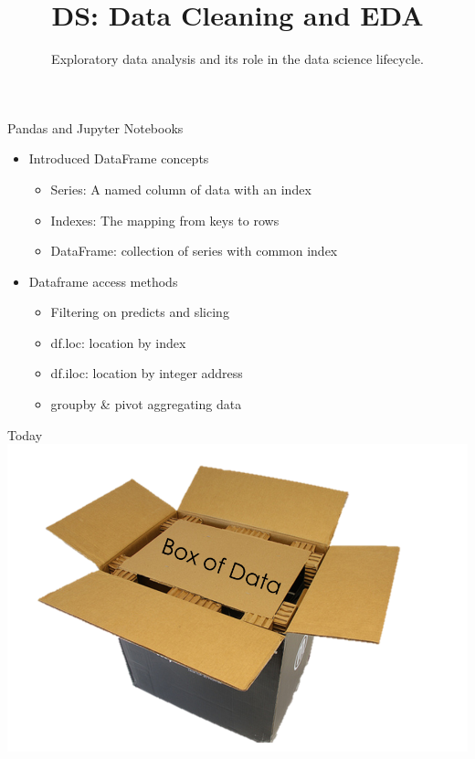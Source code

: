 \documentclass[aspectratio=169]{../latex_main/tntbeamer}  %
\title[Introduction]{DS: Data Cleaning and EDA}
\subtitle{Exploratory data analysis and its role in the data science lifecycle.}
\begin{document}
	
	\maketitle
	\begin{frame}{Pandas and Jupyter Notebooks}
	    \begin{itemize}
	        \item Introduced DataFrame concepts
	        \begin{itemize}
	            \item Series: A named column of data with an index
	            \item Indexes: The mapping from keys to rows
	            \item DataFrame: collection of series with common index
	        \end{itemize}
	        \item Dataframe access methods
	        \begin{itemize}
	            \item Filtering on predicts and slicing
	            \item df.loc: location by index
	            \item df.iloc: location by integer address
	            \item groupby \& pivot aggregating data
	        \end{itemize}
	    \end{itemize}
	\end{frame}
	
	
	\begin{frame}{Today}
	    \centering
	    \includegraphics[scale=.5]{Bild1}
	    
	\end{frame}
	
\end{document}
